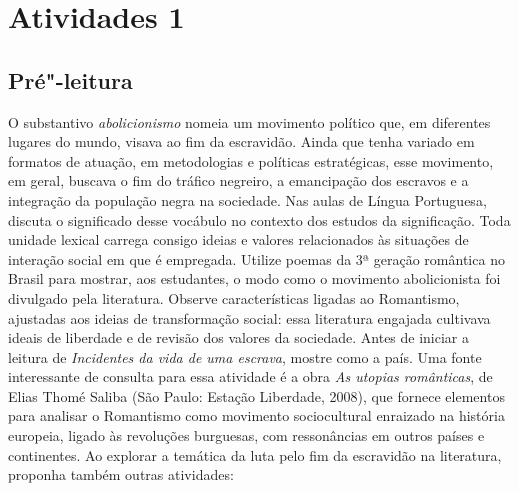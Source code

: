 \documentclass[12pt]{extarticle}
\begin{document}
\tableofcontents


\section{Atividades 1}


\subsection{Pré"-leitura}


O substantivo \emph{abolicionismo} nomeia um movimento
político que, em diferentes lugares do mundo, visava ao fim da
escravidão. Ainda que tenha variado em formatos de atuação, em
metodologias e políticas estratégicas, esse movimento, em geral, buscava
o fim do tráfico negreiro, a emancipação dos escravos e a integração da
população negra na sociedade. Nas aulas de Língua Portuguesa, discuta o
significado desse vocábulo no contexto dos estudos da significação. Toda
unidade lexical carrega consigo ideias e valores relacionados às
situações de interação social em que é empregada. Utilize poemas da 3ª
geração romântica no Brasil para mostrar, aos estudantes, o modo como o
movimento abolicionista foi divulgado pela literatura. Observe
características ligadas ao Romantismo, ajustadas aos ideias de
transformação social: essa literatura engajada cultivava ideais de
liberdade e de revisão dos valores da sociedade. Antes de iniciar a
leitura de \emph{Incidentes da vida de uma escrava}, mostre como a
país. Uma fonte interessante de consulta para essa atividade é a obra
\emph{As utopias românticas}, de Elias Thomé Saliba (São Paulo: Estação
Liberdade, 2008), que fornece elementos para analisar o Romantismo como
movimento sociocultural enraizado na história europeia, ligado às
revoluções burguesas, com ressonâncias em outros países e continentes.
Ao explorar a temática da luta pelo fim da escravidão na literatura,
proponha também outras atividades:
\end{document}
